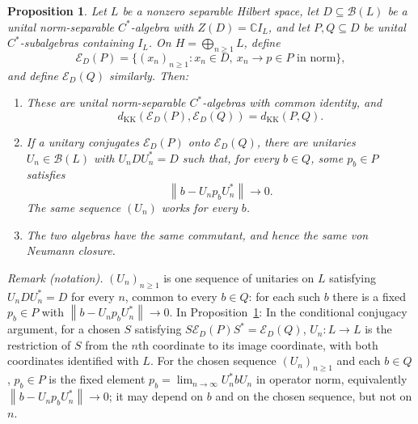 \documentclass[11pt]{article}
\newtheorem{proposition}[theorem]{Proposition}
\theoremstyle{definition}
\theoremstyle{remark}
\newcommand{\C}{\mathbb C}
\newcommand{\B}{\mathcal B}
\newcommand{\E}{\mathcal E}
\newcommand{\KK}{d_{\mathrm{KK}}}
\newcommand{\id}{I}
\newcommand{\norm}[1]{\left\|#1\right\|}
\begin{document}
\begin{proposition}\label{prop:sequences}
Let $L$ be a nonzero separable Hilbert space, let $D\subseteq\B(L)$ be a
unital norm-separable $C^*$-algebra with $Z(D)=\C\id_L$, and let
$P,Q\subseteq D$ be unital $C^*$-subalgebras containing $\id_L$.
On $H=\bigoplus_{n\ge1}L$, define
\begin{equation}\label{eq:sequence-definition}
\E_D(P)=\{(x_n)_{n\ge1}:x_n\in D,\ x_n\to p\in P\text{ in norm}\},
\end{equation}
and define $\E_D(Q)$ similarly. Then:
\begin{enumerate}
\item These are unital norm-separable $C^*$-algebras with common identity,
and
\begin{equation}\label{eq:distance-equality}
\KK(\E_D(P),\E_D(Q))=\KK(P,Q).
\end{equation}
\item If a unitary conjugates $\E_D(P)$ onto $\E_D(Q)$, there are unitaries
$U_n\in\B(L)$ with $U_nDU_n^*=D$ such that, for every $b\in Q$, some
$p_b\in P$ satisfies
\begin{equation}\label{eq:pointwise-normalizers}
\norm{b-U_np_bU_n^*}\longrightarrow0.
\end{equation}
The same sequence $(U_n)$ works for every $b$.
\item The two algebras have the same commutant, and hence the same
von Neumann closure.
\end{enumerate}
\end{proposition}

\noindent\textit{Remark (notation).} $(U_n)_{n\ge1}$ is one sequence of unitaries on $L$ satisfying $U_nDU_n^*=D$ for every $n$, common to every $b\in Q$: for each such $b$ there is a fixed $p_b\in P$ with $\norm{b-U_np_bU_n^*}\to0$. In Proposition~\ref{prop:sequences}: In the conditional conjugacy argument, for a chosen $S$ satisfying $S\E_D(P)S^*=\E_D(Q)$, $U_n:L\to L$ is the restriction of $S$ from the $n$th coordinate to its image coordinate, with both coordinates identified with $L$. For the chosen sequence $(U_n)_{n\ge1}$ and each $b\in Q$, $p_b\in P$ is the fixed element $p_b=\lim_{n\to\infty}U_n^*bU_n$ in operator norm, equivalently $\norm{b-U_np_bU_n^*}\to0$; it may depend on $b$ and on the chosen sequence, but not on $n$.
\end{document}
